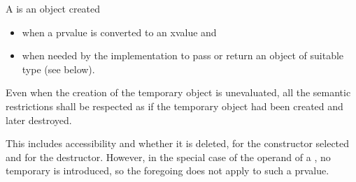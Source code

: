 \pnum
{}%
%
%
%
A  is an object created
\begin{itemize}
\item
when a prvalue is converted to an xvalue and
\item
when needed by the implementation to pass or return an object of suitable type (see below).
\end{itemize}
Even when the creation of the temporary object is
unevaluated,
all the semantic restrictions shall be respected as if the temporary object
had been created and later destroyed.
\begin{note}
This includes accessibility and whether it is deleted,
for the constructor selected and for the destructor. However, in the special
case of the operand of a
, no temporary is introduced,
so the foregoing does not apply to such a prvalue.
\end{note}

